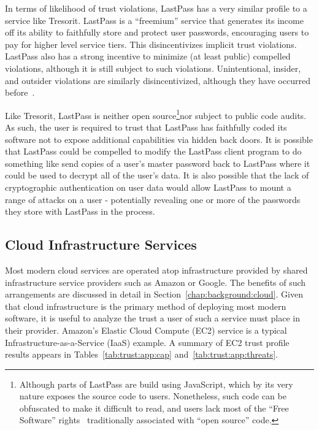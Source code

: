 In terms of likelihood of trust violations, LastPass has a very
similar profile to a service like Tresorit. LastPass is a ``freemium''
service that generates its income off its ability to faithfully store
and protect user passwords, encouraging users to pay for higher level
service tiers. This disincentivizes implicit trust
violations. LastPass also has a strong incentive to minimize (at least
public) compelled violations, although it is still subject to such
violations. Unintentional, insider, and outsider violations are
similarly disincentivized, although they have occurred
before~\cite{lastpass-blog-breach}.

Like Tresorit, LastPass is neither open source\footnote{Although parts
  of LastPass are build using JavaScript, which by its very nature
  exposes the source code to users. Nonetheless, such code can be
  obfuscated to make it difficult to read, and users lack most of the
  ``Free Software'' rights~\cite{fsf-freedoms} traditionally
  associated with ``open source'' code.}nor subject to public code
audits. As such, the user is required to trust that LastPass has
faithfully coded its software not to expose additional capabilities
via hidden back doors. It is possible that LastPass could be compelled
to modify the LastPass client program to do something like send copies
of a user's master password back to LastPass where it could be used to
decrypt all of the user's data. It is also possible that the lack of
cryptographic authentication on user data would allow LastPass to
mount a range of attacks on a user - potentially revealing one or more
of the passwords they store with LastPass in the process.

\subsection{Cloud Infrastructure Services}

Most modern cloud services are operated atop infrastructure provided
by shared infrastructure service providers such as Amazon or
Google. The benefits of such arrangements are discussed in detail in
Section~\ref{chap:background:cloud}. Given that cloud infrastructure
is the primary method of deploying most modern software, it is useful
to analyze the trust a user of such a service must place in their
provider. Amazon's Elastic Cloud Compute (EC2) service is a typical
Infrastructure-as-a-Service (IaaS) example. A summary of EC2 trust
profile results appears in Tables~\ref{tab:trust:app:cap}
and~\ref{tab:trust:app:threats}.

